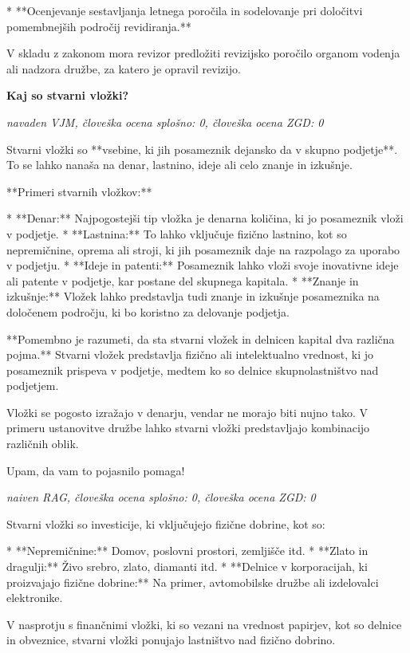 \documentclass[a4paper,12pt,openright]{book}
\begin{document}
* **Ocenjevanje sestavljanja letnega poročila in sodelovanje pri določitvi pomembnejših področij revidiranja.**



V skladu z zakonom mora revizor predložiti revizijsko poročilo organom vodenja ali nadzora družbe, za katero je opravil revizijo.

\vspace{0.5cm}
\textbf{Kaj so stvarni vložki?}

\textit{navaden VJM, človeška ocena splošno: 0, človeška ocena ZGD: 0}

Stvarni vložki so **vsebine, ki jih posameznik dejansko da v skupno podjetje**. To se lahko nanaša na denar, lastnino, ideje ali celo znanje in izkušnje.

**Primeri stvarnih vložkov:**

* **Denar:** Najpogostejši tip vložka je denarna količina, ki jo posameznik vloži v podjetje.
* **Lastnina:** To lahko vključuje fizično lastnino, kot so nepremičnine, oprema ali stroji, ki jih posameznik daje na razpolago za uporabo v podjetju.
* **Ideje in patenti:** Posameznik lahko vloži svoje inovativne ideje ali patente v podjetje, kar postane del skupnega kapitala.
* **Znanje in izkušnje:** Vložek lahko predstavlja tudi znanje in izkušnje posameznika na določenem področju, ki bo koristno za delovanje podjetja.

**Pomembno je razumeti, da sta stvarni vložek in delnicen kapital dva različna pojma.** Stvarni vložek predstavlja fizično ali intelektualno vrednost, ki jo posameznik prispeva v podjetje, medtem ko so delnice skupnolastništvo nad podjetjem.

Vložki se pogosto izražajo v denarju, vendar ne morajo biti nujno tako. V primeru ustanovitve družbe lahko stvarni vložki predstavljajo kombinacijo različnih oblik.


Upam, da vam to pojasnilo pomaga!

\vspace{0.5cm}
\textit{naiven RAG, človeška ocena splošno: 0, človeška ocena ZGD: 0}

Stvarni vložki so investicije, ki vključujejo fizične dobrine, kot so:

* **Nepremičnine:** Domov, poslovni prostori, zemljišče itd.
* **Zlato in dragulji:** Živo srebro, zlato, diamanti itd.
* **Delnice v korporacijah, ki proizvajajo fizične dobrine:** Na primer, avtomobilske družbe ali izdelovalci elektronike.

V nasprotju s finančnimi vložki, ki so vezani na vrednost papirjev, kot so delnice in obveznice, stvarni vložki ponujajo lastništvo nad fizično dobrino.
\end{document}
